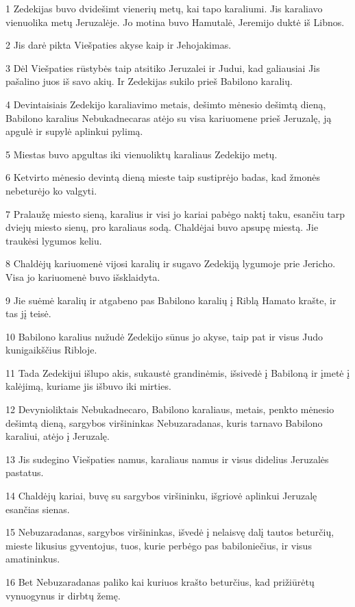\par 1 Zedekijas buvo dvidešimt vienerių metų, kai tapo karaliumi. Jis karaliavo vienuolika metų Jeruzalėje. Jo motina buvo Hamutalė, Jeremijo duktė iš Libnos. 
\par 2 Jis darė pikta Viešpaties akyse kaip ir Jehojakimas. 
\par 3 Dėl Viešpaties rūstybės taip atsitiko Jeruzalei ir Judui, kad galiausiai Jis pašalino juos iš savo akių. Ir Zedekijas sukilo prieš Babilono karalių. 
\par 4 Devintaisiais Zedekijo karaliavimo metais, dešimto mėnesio dešimtą dieną, Babilono karalius Nebukadnecaras atėjo su visa kariuomene prieš Jeruzalę, ją apgulė ir supylė aplinkui pylimą. 
\par 5 Miestas buvo apgultas iki vienuoliktų karaliaus Zedekijo metų. 
\par 6 Ketvirto mėnesio devintą dieną mieste taip sustiprėjo badas, kad žmonės nebeturėjo ko valgyti. 
\par 7 Pralaužę miesto sieną, karalius ir visi jo kariai pabėgo naktį taku, esančiu tarp dviejų miesto sienų, pro karaliaus sodą. Chaldėjai buvo apsupę miestą. Jie traukėsi lygumos keliu. 
\par 8 Chaldėjų kariuomenė vijosi karalių ir sugavo Zedekiją lygumoje prie Jericho. Visa jo kariuomenė buvo išsklaidyta. 
\par 9 Jie suėmė karalių ir atgabeno pas Babilono karalių į Riblą Hamato krašte, ir tas jį teisė. 
\par 10 Babilono karalius nužudė Zedekijo sūnus jo akyse, taip pat ir visus Judo kunigaikščius Ribloje. 
\par 11 Tada Zedekijui išlupo akis, sukaustė grandinėmis, išsivedė į Babiloną ir įmetė į kalėjimą, kuriame jis išbuvo iki mirties. 
\par 12 Devynioliktais Nebukadnecaro, Babilono karaliaus, metais, penkto mėnesio dešimtą dieną, sargybos viršininkas Nebuzaradanas, kuris tarnavo Babilono karaliui, atėjo į Jeruzalę. 
\par 13 Jis sudegino Viešpaties namus, karaliaus namus ir visus didelius Jeruzalės pastatus. 
\par 14 Chaldėjų kariai, buvę su sargybos viršininku, išgriovė aplinkui Jeruzalę esančias sienas. 
\par 15 Nebuzaradanas, sargybos viršininkas, išvedė į nelaisvę dalį tautos beturčių, mieste likusius gyventojus, tuos, kurie perbėgo pas babiloniečius, ir visus amatininkus. 
\par 16 Bet Nebuzaradanas paliko kai kuriuos krašto beturčius, kad prižiūrėtų vynuogynus ir dirbtų žemę. 
